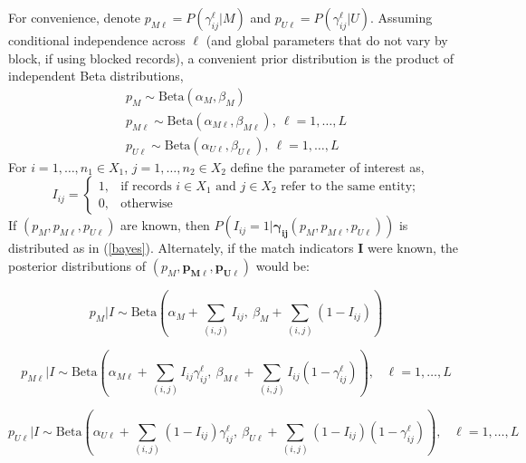 \documentclass[12pt]{article}
\newcommand\gamij{\mathbf{\gamma_{ij}}}
\newcommand\params{(p_M, p_{M\ell}, p_{U\ell})}
\begin{document}
\begin{enumerate}
For convenience, denote $p_{M\ell} = P(\gamma_{ij}^{\ell} | M)$ and $ p_{U\ell} = P(\gamma_{ij}^{\ell} | U)$.  Assuming conditional independence across $\ell$ (and global parameters that do not vary by block, if using blocked records), a convenient prior distribution is the product of independent Beta distributions,
 \begin{gather*}
 p_M \sim \text{Beta}(\alpha_M, \beta_M) \\
 p_{M\ell} \sim \text{Beta}(\alpha_{M\ell}, \beta_{M\ell}), \ \ell = 1,\dots, L \\
  p_{U\ell} \sim \text{Beta}(\alpha_{U\ell}, \beta_{U\ell}), \ \ell = 1,\dots, L 
 \end{gather*}
 For $i=1,\dots,n_1 \in X_1$, $j = 1, \dots, n_2 \in X_2$ define the parameter of interest as,
$$I_{ij} = \begin{cases} 1, & \text{if records $i\in X_1$ and $j\in X_2$ refer to the same entity;} \\ 0, & \text{otherwise} \end{cases} $$  
If $\params$ are known, then $P(I_{ij} = 1 | \gamij \params)$ is distributed as in (\ref{bayes}).  Alternately, if the match indicators $\mathbf{I}$ were known, the posterior distributions of $\left(p_M, \mathbf{p_{M\ell}, p_{U\ell}}\right)$ would be:

\begin{equation}
p_M | I \sim \text{Beta}\left(\alpha_M + \sum_{(i,j)} I_{ij},\ \beta_M + \sum_{(i,j)} (1- I_{ij})\right) 
\label{eq:pM}
\end{equation}

\begin{equation}
p_{M\ell} | I \sim \text{Beta}\left(\alpha_{M\ell} + \sum_{(i,j)} I_{ij}\gamma_{ij}^{\ell},\ \beta_{M\ell} + \sum_{(i,j)} I_{ij} (1-\gamma_{ij}^{\ell})\right), \hspace{10pt} \ell = 1,\dots, L
\label{eq:pML}
\end{equation}

\begin{equation}
p_{U\ell} | I \sim \text{Beta}\left(\alpha_{U\ell} + \sum_{(i,j)}(1-I_{ij})\gamma_{ij}^{\ell},\ \beta_{U\ell} + \sum_{(i,j)}(1-I_{ij})(1-\gamma_{ij}^{\ell})\right), \hspace{10pt} \ell = 1,\dots, L
\label{eq:pUL}
\end{equation}



\end{enumerate}
\end{document}

